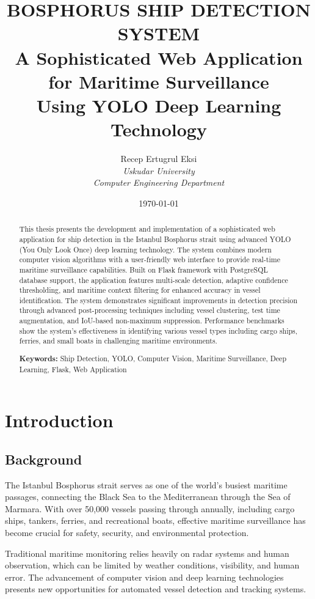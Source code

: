 \documentclass[12pt,a4paper]{report}
\title{
    \Large{\textbf{BOSPHORUS SHIP DETECTION SYSTEM}} \\
    \vspace{0.5cm}
    \large{A Sophisticated Web Application for Maritime Surveillance} \\
    \large{Using YOLO Deep Learning Technology}
}
\author{
    Recep Ertugrul Eksi \\
    \textit{Uskudar University} \\
    \textit{Computer Engineering Department}
}
\date{\today}
\begin{document}
\maketitle

\begin{abstract}
This thesis presents the development and implementation of a sophisticated web application for ship detection in the Istanbul Bosphorus strait using advanced YOLO (You Only Look Once) deep learning technology. The system combines modern computer vision algorithms with a user-friendly web interface to provide real-time maritime surveillance capabilities. Built on Flask framework with PostgreSQL database support, the application features multi-scale detection, adaptive confidence thresholding, and maritime context filtering for enhanced accuracy in vessel identification. The system demonstrates significant improvements in detection precision through advanced post-processing techniques including vessel clustering, test time augmentation, and IoU-based non-maximum suppression. Performance benchmarks show the system's effectiveness in identifying various vessel types including cargo ships, ferries, and small boats in challenging maritime environments.

\textbf{Keywords:} Ship Detection, YOLO, Computer Vision, Maritime Surveillance, Deep Learning, Flask, Web Application
\end{abstract}

\tableofcontents

\chapter{Introduction}

\section{Background}
The Istanbul Bosphorus strait serves as one of the world's busiest maritime passages, connecting the Black Sea to the Mediterranean through the Sea of Marmara. With over 50,000 vessels passing through annually, including cargo ships, tankers, ferries, and recreational boats, effective maritime surveillance has become crucial for safety, security, and environmental protection.

Traditional maritime monitoring relies heavily on radar systems and human observation, which can be limited by weather conditions, visibility, and human error. The advancement of computer vision and deep learning technologies presents new opportunities for automated vessel detection and tracking systems.
\end{document}

